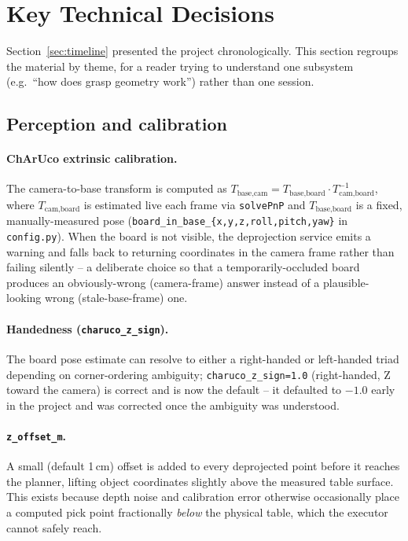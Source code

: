 \section{Key Technical Decisions}
\label{sec:tech-decisions}

Section~\ref{sec:timeline} presented the project chronologically. This
section regroups the material by theme, for a reader trying to understand
one subsystem (e.g.\ ``how does grasp geometry work'') rather than one
session.

\subsection{Perception and calibration}

\paragraph{ChArUco extrinsic calibration.} The camera-to-base transform is
computed as $T_{\text{base,cam}} = T_{\text{base,board}} \cdot
T_{\text{cam,board}}^{-1}$, where $T_{\text{cam,board}}$ is estimated live
each frame via \texttt{solvePnP} and $T_{\text{base,board}}$ is a fixed,
manually-measured pose (\texttt{board\_in\_base\_\{x,y,z,roll,pitch,yaw\}}
in \texttt{config.py}). When the board is not visible, the deprojection
service emits a warning and falls back to returning coordinates in the
camera frame rather than failing silently -- a deliberate choice so that a
temporarily-occluded board produces an obviously-wrong (camera-frame)
answer instead of a plausible-looking wrong (stale-base-frame) one.

\paragraph{Handedness (\texttt{charuco\_z\_sign}).} The board pose estimate
can resolve to either a right-handed or left-handed triad depending on
corner-ordering ambiguity; \texttt{charuco\_z\_sign=1.0} (right-handed, Z
toward the camera) is correct and is now the default -- it defaulted to
$-1.0$ early in the project and was corrected once the ambiguity was
understood.

\paragraph{\texttt{z\_offset\_m}.} A small (default 1\,cm) offset is added to
every deprojected point before it reaches the planner, lifting object
coordinates slightly above the measured table surface. This exists because
depth noise and calibration error otherwise occasionally place a computed
pick point fractionally \emph{below} the physical table, which the executor
cannot safely reach.

